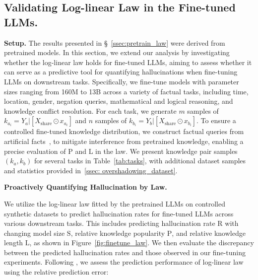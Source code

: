 \subsection{Validating Log-linear Law in the Fine-tuned LLMs.}
\label{ssec:finetune_law}



\noindent \textbf{Setup.}
The results presented in \S~\ref{ssec:pretrain_law} were derived from pretrained models. In this section, we extend our analysis by investigating whether the log-linear law holds for fine-tuned LLMs, aiming to assess whether it can serve as a predictive tool for quantifying hallucinations when fine-tuning LLMs on downstream tasks. Specifically, we fine-tune models with parameter sizes ranging from 160M to 13B across a variety of factual tasks, including time, location, gender, negation queries, mathematical and logical reasoning, and knowledge conflict resolution.
For each task, we generate $m$ samples of $k_{a_i} = Y_a | [X_{\mathrm{share}} \odot x_{a_i}]$ and $n$ samples of $k_{b_i} = Y_b | [X_{\mathrm{share}} \odot x_{b_i}]$.
To ensure a controlled fine-tuned knowledge distribution, we construct factual queries from artificial facts~\cite{meng2022locating}, to mitigate interference from pretrained knowledge, enabling a precise evaluation of $\text{P}$ and $\text{L}$ in the law.
We present knowledge pair samples $(k_a, k_b)$ for several tasks in Table~\ref{tab:tasks}, with additional dataset samples and statistics provided in~\ref{ssec: overshadowing_dataset}.


\vspace{1mm}
\noindent \textbf{Proactively Quantifying Hallucination by Law.}

We utilize the log-linear law fitted by the pretrained LLMs on controlled synthetic datasets to predict hallucination rates for fine-tuned LLMs across various downstream tasks. This includes predicting hallucination rate $\text{R}$ with changing model size $\text{S}$, relative knowledge popularity $\text{P}$, and relative knowledge length $\text{L}$, as shown in Figure~\ref{fig:finetune_law}. We then evaluate the discrepancy between the predicted hallucination rates and those observed in our fine-tuning experiments. Following \citet{chen2024scaling}, we assess the prediction performance of log-linear law using the relative prediction error:

